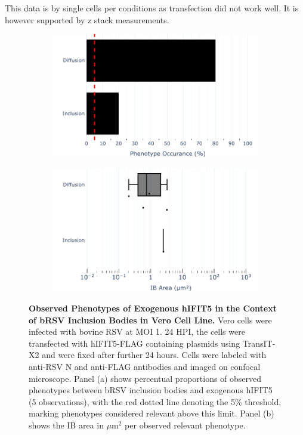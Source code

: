This data is by single cells per conditions as transfection did not work well. It is however supported by z stack measurements.

\begin{figure}
    \begin{subfigure}{0.495\textwidth}
        \caption{}
        \includegraphics[width=1\linewidth]{09. Chapter 4/Figs/02. Overexpression/04. IFIT5/04. bar_i5_brsv.pdf} 
    \end{subfigure}
    \begin{subfigure}{0.495\textwidth}
        \caption{}
        \includegraphics[width=1\linewidth]{09. Chapter 4/Figs/02. Overexpression/04. IFIT5/05. box_i5_brsv.pdf}
    \end{subfigure}
    \caption[Observed Phenotypes of Exogenous hIFIT5 in the Context of bRSV Inclusion Bodies in Vero Cell Line.]{\textbf{Observed Phenotypes of Exogenous hIFIT5 in the Context of bRSV Inclusion Bodies in Vero Cell Line.} Vero cells were infected with bovine RSV at MOI 1. 24 HPI, the cells were transfected with hIFIT5-FLAG containing plasmids using TransIT-X2 and were fixed after further 24 hours. Cells were labeled with anti-RSV N and anti-FLAG antibodies and imaged on confocal microscope. Panel (a) shows percentual proportions of observed phenotypes between bRSV inclusion bodies and exogenous hIFIT5 (5 observations), with the red dotted line denoting the 5\% threshold, marking phenotypes considered relevant above this limit. Panel (b) shows the IB area in \(\mu \mbox{m}^2\) per observed relevant phenotype.}
    \label{fig:Observed Phenotypes of Exogenous hIFIT5 in the Context of bRSV Inclusion Bodies in VERO Cell Line}
\end{figure}

